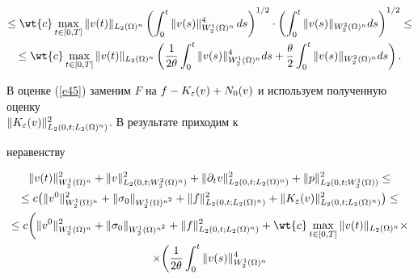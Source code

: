 \begin{pf}
\begin{multline*}
%


\le \wt{c} \maxl {t \in [0,T]}\|v(t)\|_{L_2(\Om)^n} \left(


\intl 0 t \|v(s)\|_{W_2^1(\Om)^n}^4 \, ds\right)^{1/2}\cdot \left(


\intl 0 t\|v(s)\|_{W_2^2(\Om)^n} ds \right)^{1/2} \le \\


%


\le \wt{c}\maxl {t \in [0,T]}\|v(t)\|_{L_2(\Om)^n} \left(


\frac{1}{2\theta}\intl 0 t \|v(s)\|_{W_2^1(\Om)^n}^4


 ds + \frac{\theta}{2}\intl 0 t \|v(s)\|_{W_2^2(\Om)^n} ds\right).


\end{multline*}





В оценке (\ref{e45}) заменим $F$ на $f-K_{\eps}(v)+


N_0(v)$ и используем полученную оценку \\


$\|K_{\varepsilon}(v)\|_{L_2(0,t;L_2(\Omega)^n)}^2$. В результате приходим к


неравенству


\begin{multline*}


\|v(t)\|_{W^1_2(\Om)^n}^2 


+\|v\|_{L_2(0,t;W_2^2(\Om)^n)}^2 +


\|\partial_t v\|_{L_2(0,t;L_2(\Om)^n)}^2 +


\|p\|_{L_2(0,t;W_2^1(\Om))}^2 \le \\


%


\le c \big(\|v^0\|_{W^1_2(\Om)^n}^2 +


\|\sig_0\|_{W^1_2(\Om)^{n^2}}+\|f\|_{L_2(0,t;L_2(\Om)^n)}^2+


\|K_{\eps}(v)\|_{L_2(0,t;L_2(\Om)^n)}^2 \big) \le \\


%


\le c \bigg(\|v^0\|_{W^1_2(\Om)^n}^2 +


\|\sig_0\|_{W^1_2(\Om)^{n^2}}+\|f\|_{L_2(0,t;L_2(\Om)^n)}^2


+\wt{c} \maxl {t \in[0,T]}\|v(t)\|_{L_2(\Om)^n}\times \\


%


\times\bigg(\frac{1}{2\theta}\intl 0 t \|v(s)\|_{W_2^1(\Om)^n}^4



\end{multline*}
\end{pf}

